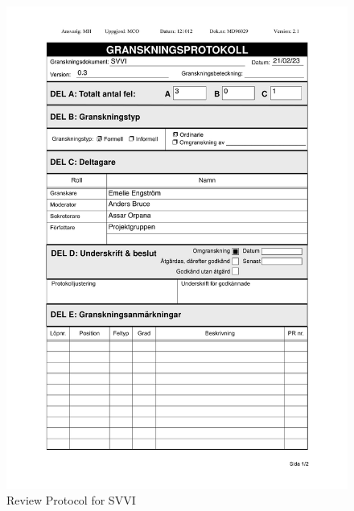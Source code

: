 \documentclass{article}
\begin{document}
 
  \begin{figure}
     \centering
     \includegraphics[width=13cm]{images/SVVI - Granskningsprotokoll-1}
     \renewcommand\figurename{Figure}
     \caption{Review Protocol for SVVI}
     \label{fig:my_label}
 \end{figure}
  
\end{document}
